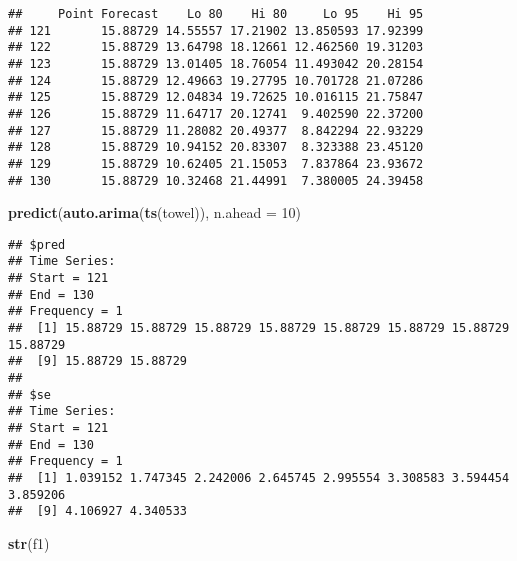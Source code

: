 \documentclass[
]{article}
\newenvironment{Shaded}{\begin{snugshade}}{\end{snugshade}}
\newcommand{\AttributeTok}[1]{\textcolor[rgb]{0.13,0.29,0.53}{#1}}
\newcommand{\DecValTok}[1]{\textcolor[rgb]{0.00,0.00,0.81}{#1}}
\newcommand{\FunctionTok}[1]{\textcolor[rgb]{0.13,0.29,0.53}{\textbf{#1}}}
\newcommand{\NormalTok}[1]{#1}
\begin{document}
\begin{verbatim}
##     Point Forecast    Lo 80    Hi 80     Lo 95    Hi 95
## 121       15.88729 14.55557 17.21902 13.850593 17.92399
## 122       15.88729 13.64798 18.12661 12.462560 19.31203
## 123       15.88729 13.01405 18.76054 11.493042 20.28154
## 124       15.88729 12.49663 19.27795 10.701728 21.07286
## 125       15.88729 12.04834 19.72625 10.016115 21.75847
## 126       15.88729 11.64717 20.12741  9.402590 22.37200
## 127       15.88729 11.28082 20.49377  8.842294 22.93229
## 128       15.88729 10.94152 20.83307  8.323388 23.45120
## 129       15.88729 10.62405 21.15053  7.837864 23.93672
## 130       15.88729 10.32468 21.44991  7.380005 24.39458
\end{verbatim}

\begin{Shaded}
\begin{Highlighting}[]
\FunctionTok{predict}\NormalTok{(}\FunctionTok{auto.arima}\NormalTok{(}\FunctionTok{ts}\NormalTok{(towel)), }\AttributeTok{n.ahead =} \DecValTok{10}\NormalTok{)}
\end{Highlighting}
\end{Shaded}

\begin{verbatim}
## $pred
## Time Series:
## Start = 121 
## End = 130 
## Frequency = 1 
##  [1] 15.88729 15.88729 15.88729 15.88729 15.88729 15.88729 15.88729 15.88729
##  [9] 15.88729 15.88729
## 
## $se
## Time Series:
## Start = 121 
## End = 130 
## Frequency = 1 
##  [1] 1.039152 1.747345 2.242006 2.645745 2.995554 3.308583 3.594454 3.859206
##  [9] 4.106927 4.340533
\end{verbatim}

\begin{Shaded}
\begin{Highlighting}[]
\FunctionTok{str}\NormalTok{(f1)}
\end{Highlighting}
\end{Shaded}
\end{document}
